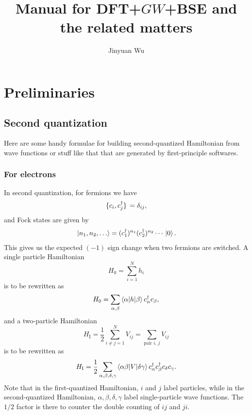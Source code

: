 \documentclass[hyperref, a4paper]{report}
\title{Manual for DFT+$GW$+BSE and the related matters}
\author{Jinyuan Wu}
\begin{document}
    
\maketitle

\tableofcontents


\chapter{Preliminaries}

\section{Second quantization}

Here are some handy formulae for building second-quantized Hamiltonian 
from wave functions or stuff like that 
that are generated by first-principle softwares.

\subsection{For electrons}

In second quantization, for fermions we have 
\begin{equation}
    \acomm*{c_i}{c_j^\dagger} = \delta_{ij},
\end{equation}
and Fock states are given by
\begin{equation}
    \ket*{n_1, n_2, \ldots} = (c_1^\dagger)^{n_1} (c_2^\dagger)^{n_2} \cdots \ket*{0}.
\end{equation}
This gives us the expected $(-1)$ sign change 
when two fermions are switched. 
A single particle Hamiltonian 
\begin{equation}
    H_0 = \sum_{i=1}^{N} h_i
\end{equation}
is to be rewritten as 
\begin{equation}
    H_0 = \sum_{\alpha, \beta} \mel**{\alpha}{h}{\beta} c_\alpha^\dagger c_\beta,
\end{equation}
and a two-particle Hamiltonian 
\begin{equation}
    H_\text{I} = \frac{1}{2} \sum_{i \neq j = 1}^{N} V_{ij}
    = \sum_{\text{pair $i$, $j$}} V_{ij}
\end{equation}
is to be rewritten as 
\begin{equation}
    H_{\text{I}} = \frac{1}{2} \sum_{\alpha, \beta, \delta, \gamma}
        \mel**{\alpha \beta}{V}{\delta \gamma} 
        c^\dagger_\alpha c^\dagger_\beta c_\delta c_\gamma.
\end{equation}
Note that in the first-quantized Hamiltonian, 
$i$ and $j$ label particles, 
while in the second-quantized Hamiltonian, 
$\alpha, \beta, \delta, \gamma$ label single-particle wave functions.
The $1/2$ factor is there to counter the double counting of $ij$ and $ji$.
\end{document}
